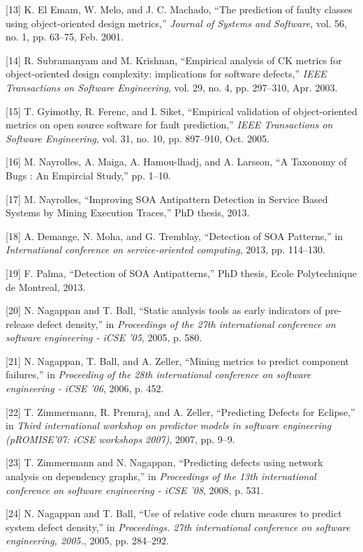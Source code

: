 \documentclass[conference]{IEEEtran}
\begin{document}
{[}13{]} K. {El Emam}, W. Melo, and J. C. Machado, ``The prediction of
faulty classes using object-oriented design metrics,'' \emph{Journal of
Systems and Software}, vol. 56, no. 1, pp. 63--75, Feb. 2001.

{[}14{]} R. Subramanyam and M. Krishnan, ``Empirical analysis of CK
metrics for object-oriented design complexity: implications for software
defects,'' \emph{IEEE Transactions on Software Engineering}, vol. 29,
no. 4, pp. 297--310, Apr. 2003.

{[}15{]} T. Gyimothy, R. Ferenc, and I. Siket, ``Empirical validation of
object-oriented metrics on open source software for fault prediction,''
\emph{IEEE Transactions on Software Engineering}, vol. 31, no. 10, pp.
897--910, Oct. 2005.

{[}16{]} M. Nayrolles, A. Maiga, A. Hamou-lhadj, and A. Larsson, ``A
Taxonomy of Bugs : An Empircial Study,'' pp. 1--10.

{[}17{]} M. Nayrolles, ``Improving SOA Antipattern Detection in Service
Based Systems by Mining Execution Traces,'' PhD thesis, 2013.

{[}18{]} A. Demange, N. Moha, and G. Tremblay, ``Detection of SOA
Patterns,'' in \emph{International conference on service-oriented
computing}, 2013, pp. 114--130.

{[}19{]} F. Palma, ``Detection of SOA Antipatterns,'' PhD thesis, Ecole
Polytechnique de Montreal, 2013.

{[}20{]} N. Nagappan and T. Ball, ``Static analysis tools as early
indicators of pre-release defect density,'' in \emph{Proceedings of the
27th international conference on software engineering - iCSE '05}, 2005,
p. 580.

{[}21{]} N. Nagappan, T. Ball, and A. Zeller, ``Mining metrics to
predict component failures,'' in \emph{Proceeding of the 28th
international conference on software engineering - iCSE '06}, 2006, p.
452.

{[}22{]} T. Zimmermann, R. Premraj, and A. Zeller, ``Predicting Defects
for Eclipse,'' in \emph{Third international workshop on predictor models
in software engineering (pROMISE'07: iCSE workshops 2007)}, 2007, pp.
9--9.

{[}23{]} T. Zimmermann and N. Nagappan, ``Predicting defects using
network analysis on dependency graphs,'' in \emph{Proceedings of the
13th international conference on software engineering - iCSE '08}, 2008,
p. 531.

{[}24{]} N. Nagappan and T. Ball, ``Use of relative code churn measures
to predict system defect density,'' in \emph{Proceedings. 27th
international conference on software engineering, 2005.}, 2005, pp.
284--292.
\end{document}
